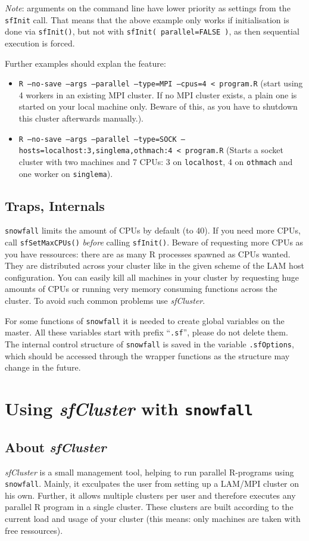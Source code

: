 \documentclass[10pt,oneside]{article}
\begin{document}
\textit{Note}: arguments on the command line have lower priority as settings from the \texttt{sfInit} call.
That means that the above example only works if initialisation is done via \texttt{sfInit()}, but
not with \texttt{sfInit( parallel=FALSE )}, as then sequential execution is forced.

Further examples should explan the feature:

\begin{itemize}
 \item \texttt{R --no-save --args --parallel --type=MPI --cpus=4 < program.R} (start using 4 workers in an existing MPI cluster. If no MPI cluster exists, a plain one is started on your local machine only. Beware of this, as you have to shutdown this cluster afterwards manually.).
 \item \texttt{R --no-save --args --parallel --type=SOCK --hosts=localhost:3,singlema,othmach:4 < program.R}
(Starts a socket cluster with two machines and 7 CPUs: 3 on \texttt{localhost}, 4 on \texttt{othmach} and one worker on \texttt{singlema}).
\end{itemize}

\subsection{Traps, Internals}
\texttt{snowfall} limits the amount of CPUs by default (to 40). If you
need more CPUs, call \texttt{sfSetMaxCPUs()} \emph{before} calling \texttt{sfInit()}.
Beware of requesting more CPUs as you have ressources: there are as many R processes
spawned as CPUs wanted. They are distributed across your cluster like in the
given scheme of the LAM host configuration. You can easily kill all machines in
your cluster by requesting huge amounts of CPUs or running very memory consuming
functions across the cluster. To avoid such common problems use \emph{sfCluster}.

For some functions of \texttt{snowfall} it is needed to create global variables
on the master. All these variables start with prefix ``\texttt{.sf}'', please do
not delete them. The internal control structure of \texttt{snowfall} is saved in
the variable \texttt{.sfOptions}, which should be accessed through the wrapper
functions as the structure may change in the future.\section{Using \emph{sfCluster} with \texttt{snowfall}}
\subsection{About \emph{sfCluster}}
\emph{sfCluster} is a small management tool, helping to run parallel R-programs
using \texttt{snowfall}. Mainly, it exculpates the user from setting up a LAM/MPI
cluster on his own. Further, it allows multiple clusters per user and
therefore executes any parallel R program in a single cluster. These clusters
are built according to the current load and usage of your cluster (this
means: only machines are taken with free ressources).
\end{document}
